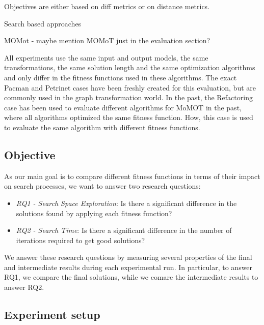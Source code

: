 Objectives are either based on diff metrics or on distance metrics.


Search based approaches

MOMot - maybe mention MOMoT just in the evaluation section?


 All experiments use the same input and output models, the same transformations, the same solution length and the 
same optimization algorithms and only differ in the fitness functions used in these algorithms. 
The exact Pacman and Petrinet cases have been freshly created for this evaluation, but are commonly used in the graph transformation world.
In the past, the Refactoring case has been used to evaluate different algorithms for MoMOT in the past, where all algorithms optimized the same fitness function. How, this case is used to evaluate the same algorithm with different fitness functions.


\subsection{Objective}

As our main goal is to compare different fitness functions in terms of their impact on search processes, we want to answer two research questions:

\begin{itemize}
	\item \textit{RQ1 - Search Space Exploration}: Is there a significant difference in the solutions found by applying each fitness function?
	\item \textit{RQ2 - Search Time}: Is there a significant difference in the number of iterations required to get good solutions?
\end{itemize}

We answer these research questions by measuring several properties of the final and intermediate results during each experimental run.
In particular, to answer RQ1, we compare the final solutions, while we comare the intermediate results to answer RQ2.

\subsection{Experiment setup}


